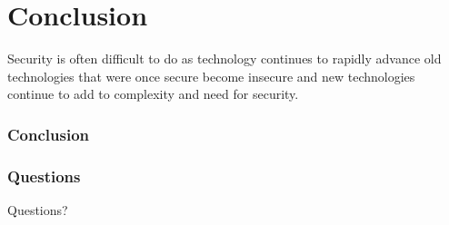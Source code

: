 \documentclass{beamer}
\begin{document}
\section{Conclusion}
	\begin{frame}
		Security is often difficult to do as technology continues to rapidly advance old technologies that were once secure become insecure and new technologies continue to add to complexity and need for security.
		\frametitle{Conclusion}
		\end{frame}	
		
		\begin{frame}
		\frametitle{Questions}
			\begin{center}
			\Huge Questions?
			\end{center}
		\end{frame}	
\end{document}
